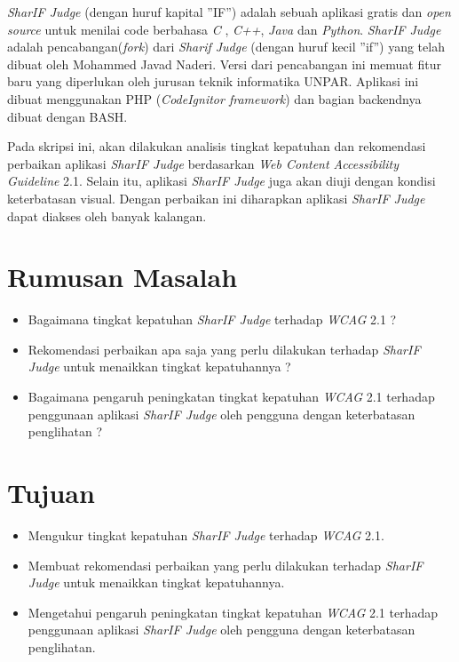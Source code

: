 \textit{SharIF Judge} \cite{SharIF_Judge} (dengan huruf kapital ''IF'') adalah sebuah aplikasi gratis dan \textit{open source} untuk menilai code berbahasa \textit{C} , \textit{C++}, \textit{Java} dan \textit{Python}. \textit{SharIF Judge} adalah pencabangan(\textit{fork}) dari \textit{Sharif Judge} \cite{Sharif_Judge_Original} (dengan huruf kecil ''if'') yang telah dibuat oleh Mohammed Javad Naderi. Versi dari pencabangan ini memuat fitur baru yang diperlukan oleh jurusan teknik informatika UNPAR. Aplikasi ini dibuat menggunakan PHP (\textit{CodeIgnitor framework})\cite{Codeigniter} dan bagian backendnya dibuat dengan BASH.

Pada skripsi ini, akan dilakukan analisis tingkat kepatuhan dan rekomendasi perbaikan aplikasi \textit{SharIF Judge} berdasarkan \textit{Web Content Accessibility Guideline} 2.1. Selain itu, aplikasi \textit{SharIF Judge} juga akan diuji dengan kondisi keterbatasan visual. Dengan perbaikan ini diharapkan aplikasi \textit{SharIF Judge} dapat diakses oleh banyak kalangan.

\section{Rumusan Masalah}
\label{sec:rumusan}
\begin{itemize}
	\item Bagaimana tingkat kepatuhan \textit{SharIF Judge} terhadap \textit{WCAG} 2.1 ?
	\item Rekomendasi perbaikan apa saja yang perlu dilakukan terhadap \textit{SharIF Judge} untuk menaikkan tingkat kepatuhannya ?
	\item Bagaimana pengaruh peningkatan tingkat kepatuhan \textit{WCAG} 2.1 terhadap penggunaan aplikasi \textit{SharIF Judge} oleh pengguna dengan keterbatasan penglihatan ?
\end{itemize}

\section{Tujuan}
\label{sec:tujuan}
\begin{itemize}
	\item Mengukur tingkat kepatuhan \textit{SharIF Judge} terhadap \textit{WCAG} 2.1.
	\item Membuat rekomendasi perbaikan yang perlu dilakukan terhadap \textit{SharIF Judge} untuk menaikkan tingkat kepatuhannya.
	\item Mengetahui pengaruh peningkatan tingkat kepatuhan \textit{WCAG} 2.1 terhadap penggunaan aplikasi \textit{SharIF Judge} oleh pengguna dengan keterbatasan penglihatan.
\end{itemize} 


